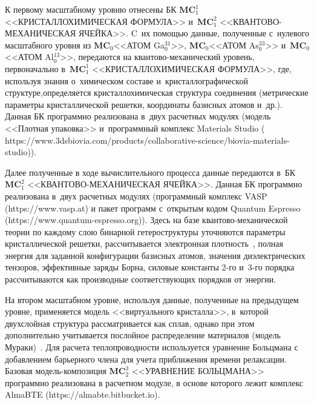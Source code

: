 \begin{multicols}{2}
    К первому масштабному уровню отнесены БК 
    $\mathbf{MC}_1^1$ <<КРИСТАЛЛОХИМИЧЕСКАЯ 
ФОРМУЛА>> и~$\mathbf{MC}_1^2$ <<КВАН\-ТО\-ВО-МЕ\-ХА\-НИ\-ЧЕ\-СКАЯ ЯЧЕЙКА>>. 
C~их по\-мощью данные, полученные с~нулевого масштабного уровня из 
$\mathbf{MC}_0$<<АТОМ Ga$_0^{31}$>>, $\mathbf{MC}_0$<<АТОМ As$_0^{33}$>>
и~$\mathbf{MC}_0$<<АТОМ Al$_0^{13}$>>, передаются на  
кван\-то\-во-ме\-ха\-ни\-че\-ский уровень, первоначально в~$\mathbf{MC}_1^1$ 
<<КРИСТАЛЛОХИМИЧЕСКАЯ ФОРМУЛА>>, где, используя знания о~химическом 
составе и~крис\-тал\-ло\-гра\-фи\-че\-ской структуре,\linebreak определяется крис\-тал\-ло\-хи\-ми\-че\-ская 
структура соединения (мет\-ри\-че\-ские параметры кристалличе\-ской решетки, 
координаты базисных атомов и~др.). Данная БК программно реализована в~двух 
рас\-чет\-ных модулях (модель <<Плотная упаковка>> и~программный комплекс 
Materials Studio ({\sf  
https://www.\linebreak 3dsbiovia.com/products/collaborative-science/biovia-materials-studio})).
    
    Далее полученные в ходе вычислительного процесса данные передаются 
в~БК $\mathbf{MC}_1^2$ <<КВАН\-ТО\-ВО-МЕ\-ХА\-НИ\-ЧЕ\-СКАЯ ЯЧЕЙКА>>. 
Данная БК программно реализована в~двух расчетных модулях 
(программный комплекс VASP ({\sf https://www.\linebreak vasp.at}) и пакет программ 
с~открытым кодом Quantum Espresso ({\sf https://www.quantum-espresso.org})). 
Здесь на базе  
кван\-то\-во-ме\-ха\-ни\-че\-ской теории по каждому слою бинарной 
гетероструктуры уточняются параметры кристаллической решетки, 
рассчитывается электронная плот\-ность~\cite{7-ab}, полная энергия для заданной 
конфигурации базисных атомов, значения диэлектрических тензоров, 
эффективные заряды Борна, силовые константы 2-го и~3-го порядка 
рассчитываются как производные со\-от\-вет\-ст\-ву\-ющих порядков от энергии.
        
    На втором масштабном уровне, используя данные, полученные на 
предыдущем уровне, применяется модель <<виртуального кристалла>>, 
в~которой двухслойная структура рассматривается как сплав, однако при этом 
дополнительно учитывается послойное распределение материалов (модель 
Мураки)~\cite{17-ab}. Для расчета теплопроводности используется уравнение 
Больцмана с добавлением барьерного члена для учета приближения времени 
релаксации. Базовая  
мо\-дель-ком\-по\-зи\-ция $\mathbf{MC}_2^3$ <<УРАВНЕНИЕ БОЛЬЦМАНА>> 
программно реализована в расчетном модуле, в основе которого лежит 
комплекс AlmaBTE ({\sf https://almabte.bitbucket.io}).


\end{multicols}
